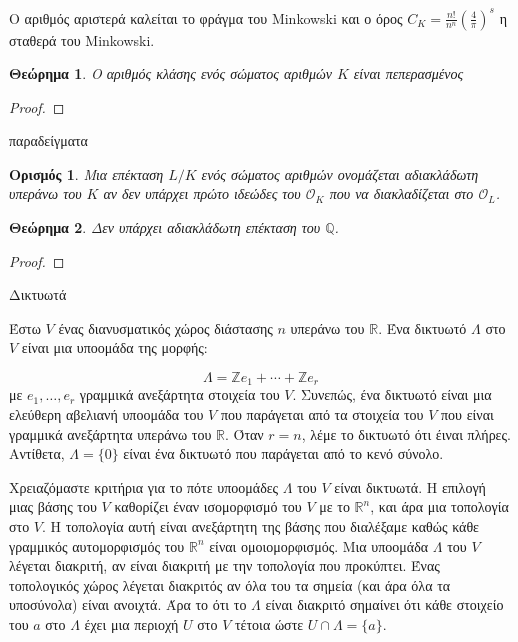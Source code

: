 \documentclass[oneside,a4paper]{article}
\newtheorem{theorem}{Θεώρημα}
\newtheorem*{defn}{Ορισμός}
\newcommand {\tl}{\textlatin}
\newcommand{\Z}{\mathbb{Z}}
\newcommand{\Q}{\mathbb{Q}}
\begin{document}
Ο αριθμός αριστερά καλείται το φράγμα του \tl{Minkowski} και ο όρος $C_K = \frac{n!}{n^n}\left(\frac{4}{\pi}\right)^s$ η σταθερά του \tl{Minkowski}.



\begin{theorem}
	Ο αριθμός κλάσης ενός σώματος αριθμών $K$ είναι πεπερασμένος
\end{theorem}

\begin{proof}
\end{proof}

παραδείγματα

\begin{defn} Μια επέκταση $L/K$ ενός σώματος αριθμών ονομάζεται αδιακλάδωτη υπεράνω του $K$ αν δεν υπάρχει πρώτο ιδεώδες του $\mathcal{O}_K$ που να διακλαδίζεται στο $\mathcal{O}_L$.
\end{defn}


\begin{theorem}
	Δεν υπάρχει αδιακλάδωτη επέκταση του $\Q$.
\end{theorem}


\begin{proof}
\end{proof}



\pagebreak

Δικτυωτά

Έστω $V$ ένας διανυσματικός χώρος διάστασης $n$ υπεράνω του $\mathbb{R}$. Ένα δικτυωτό $\Lambda$ στο $V$ είναι μια υποομάδα της μορφής:

$$\Lambda = \Z e_1 + \cdots + \Z e_r$$ με $e_1,\ldots,e_r$ γραμμικά ανεξάρτητα στοιχεία του $V$. Συνεπώς, ένα δικτυωτό είναι μια ελεύθερη αβελιανή υποομάδα του $V$ που παράγεται από τα στοιχεία του $V$ που είναι γραμμικά ανεξάρτητα υπεράνω του $\mathbb{R}$. Όταν $r=n$, λέμε το δικτυωτό ότι έιναι πλήρες. Αντίθετα, $\Lambda =\{0\}$ είναι ένα δικτυωτό που παράγεται από το κενό σύνολο.


Χρειαζόμαστε κριτήρια για το πότε υποομάδες $\Lambda$ του $V$ είναι δικτυωτά. Η επιλογή μιας βάσης του $V$ καθορίζει έναν ισομορφισμό του $V$ με το $\mathbb{R}^n$, και άρα μια τοπολογία στο $V$. Η τοπολογία αυτή είναι ανεξάρτητη της βάσης που διαλέξαμε καθώς κάθε γραμμικός αυτομορφισμός του $\mathbb{R}^n$ είναι ομοιομορφισμός. Μια υποομάδα $\Lambda$ του $V$ λέγεται διακριτή, αν είναι διακριτή με την τοπολογία που προκύπτει. Ένας τοπολογικός χώρος λέγεται διακριτός αν όλα του τα σημεία (και άρα όλα τα υποσύνολα) είναι ανοιχτά. Άρα το ότι το $\Lambda$ είναι διακριτό σημαίνει ότι κάθε στοιχείο του $a$ στο $\Lambda$ έχει μια περιοχή $U$ στο $V$ τέτοια ώστε $U \cap \Lambda = \{a\}$.
\end{document}
